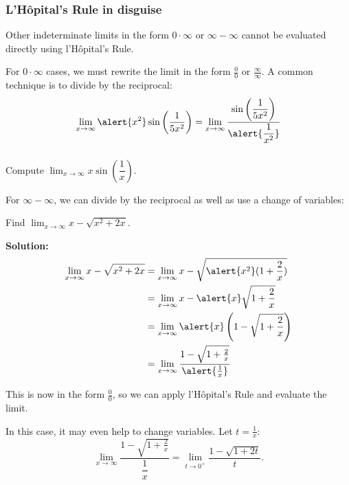 \documentclass[14pt]{beamer}
\begin{document}
\begin{frame}
\frametitle{\small L'H\^opital's Rule in disguise}
\small
Other indeterminate limits in the form $0 \cdot \infty$ or $\infty - \infty$ cannot be evaluated directly using l'H\^{o}pital's Rule.

\vspace{1pc}
For $0 \cdot \infty$ cases, we must rewrite the limit in the form $\frac{0}{0}$ or $\frac{\infty}{\infty}$.  A common technique is to divide by the reciprocal:
\[\lim_{x \to \infty} \alert{x^2} \sin \left( \frac{1}{5x^2} \right) = \lim_{x \to \infty} \frac{\sin \left( \dfrac{1}{5x^2} \right)}{\alert{\dfrac{1}{x^2}}}\]
\end{frame}

\begin{frame}%
\frametitle{}
\small
\begin{exe} Compute $\displaystyle\lim_{x \to \infty} x \sin \left( \dfrac{1}{x} \right).$ \end{exe}
\end{frame}

\begin{frame}
\footnotesize
For $\infty - \infty$, we can divide by the reciprocal as well as use a change of variables:
\begin{ex} Find $\displaystyle\lim_{x \to \infty} x-\sqrt{x^2+2x}$. \end{ex}
{\bf Solution:}
\vspace{-1.5pc}
\begin{alignat*}{2}
\lim_{x \to \infty} x-\sqrt{x^2+2x} &= \lim_{x \to \infty} x-\sqrt{\alert{x^2}(1+\frac{2}{x})} \\%
&=\lim_{x \to \infty} x-\alert{x}\sqrt{1+\frac{2}{x}} \\
&= \lim_{x \to \infty} \alert{x} \left( 1-\sqrt{1+\frac{2}{x}} \right) \\
&= \lim_{x \to \infty} \frac{ 1-\sqrt{1+\frac{2}{x}} }{\alert{\frac{1}{x}} }
\end{alignat*}
\end{frame}

\begin{frame}
\small
This is now in the form $\frac{0}{0}$, so we can apply l'H\^{o}pital's Rule and evaluate the limit.  

\vspace{1pc} 
In this case, it may even help to change variables.  Let $t=\frac{1}{x}$:
\[\lim_{x \to \infty} \frac{ 1-\sqrt{1+\frac{2}{x}} }{\dfrac{1}{x} } = \lim_{t \to 0^+} \frac{1-\sqrt{1+2t}}{t}.\]
\end{frame}
\end{document}
